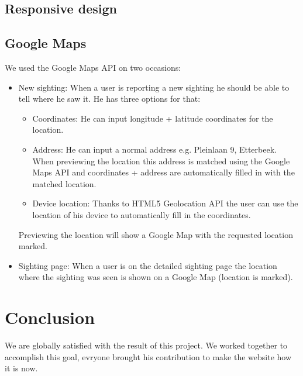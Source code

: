 \documentclass{article}
\begin{document}
\subsection{Responsive design}

\subsection{Google Maps}
We used the Google Maps API on two occasions:
\begin{itemize}
\item New sighting: When a user is reporting a new sighting he should be able to tell where he saw it. He has three options for that:
\begin{itemize}
\item Coordinates: He can input longitude + latitude coordinates for the location.
\item Address: He can input a normal address e.g. Pleinlaan 9, Etterbeek. When previewing the location this address is matched using the Google Maps API and coordinates + address are automatically filled in with the matched location.
\item Device location: Thanks to HTML5 Geolocation API the user can use the location of his device to automatically fill in the coordinates.
\end{itemize}
Previewing the location will show a Google Map with the requested location marked.
\item Sighting page: When a user is on the detailed sighting page the location where the sighting was seen is shown on a Google Map (location is marked).
\end{itemize}

\section{Conclusion}
We are globally satisfied with the result of this project. We worked together to accomplish this goal, evryone brought his contribution to make the website how it is now.
\end{document}

